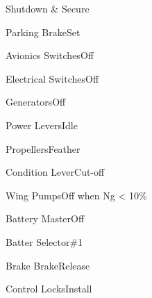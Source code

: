 \documentclass[sim-use]{checklist}
\begin{document}
\begin{checklist}{Shutdown \& Secure}
  \item{Parking Brake}{Set}
  \item{Avionics Switches}{Off}
  \item{Electrical Switches}{Off}
  \item{Generators}{Off}
  \item{Power Levers}{Idle}
  \item{Propellers}{Feather}
  \item{Condition Lever}{Cut-off}
  \item{Wing Pumps}{Off when Ng < 10\%}
  \item{Battery Master}{Off}
  \item{Batter Selector}{\#1}
  \item{Brake Brake}{Release}
  \item{Control Locks}{Install}
\end{checklist}
\end{document}
